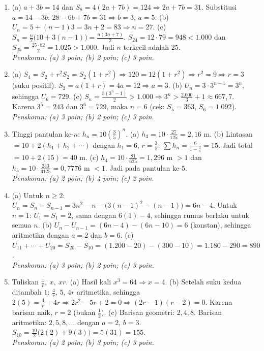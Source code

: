 \documentclass[a4paper,11pt]{article}
\newcommand{\dis}{\displaystyle}
\begin{document}
\small\begin{enumerate}[leftmargin=2em,itemsep=3pt,topsep=2pt]
\item[\textbf{1.}] (a) $a+3b=14$ dan $S_8=4(2a+7b)=124\Rightarrow2a+7b=31$. Substitusi $a=14-3b$: $28-6b+7b=31\Rightarrow b=3$, $a=5$. (b) $U_n=5+(n-1)3=3n+2=83\Rightarrow n=27$. (c) $S_n=\dis\frac n2\big(10+3(n-1)\big)=\dis\frac{n(3n+7)}{2}$. $S_{24}=12\cdot79=948<1.000$ dan $S_{25}=\dis\frac{25\cdot82}{2}=1.025>1.000$. Jadi $n$ terkecil adalah $25$. \\ \textit{Penskoran: (a) 3 poin; (b) 2 poin; (c) 3 poin.}
\item[\textbf{2.}] (a) $S_4=S_2+r^{2}S_2=S_2(1+r^{2})\Rightarrow120=12(1+r^{2})\Rightarrow r^{2}=9\Rightarrow r=3$ (suku positif). $S_2=a(1+r)=4a=12\Rightarrow a=3$. (b) $U_n=3\cdot3^{n-1}=3^{n}$, sehingga $U_6=729$. (c) $S_n=\dis\frac{3(3^{n}-1)}{2}>1.000\Rightarrow3^{n}>\dis\frac{2.000}{3}+1\approx667{,}7$. Karena $3^{5}=243$ dan $3^{6}=729$, maka $n=6$ (cek: $S_5=363$, $S_6=1.092$). \\ \textit{Penskoran: (a) 3 poin; (b) 2 poin; (c) 3 poin.}
\item[\textbf{3.}] Tinggi pantulan ke-$n$: $h_n=10\left(\dis\frac35\right)^{n}$. (a) $h_3=10\cdot\dis\frac{27}{125}=2{,}16$ m. (b) Lintasan $=10+2(h_1+h_2+\cdots)$ dengan $h_1=6$, $r=\dis\frac35$: $\sum h_n=\dis\frac{6}{1-\frac35}=15$. Jadi total $=10+2(15)=40$ m. (c) $h_4=10\cdot\dis\frac{81}{625}=1{,}296$ m $>1$ dan $h_5=10\cdot\dis\frac{243}{3125}=0{,}7776$ m $<1$. Jadi pada pantulan ke-$5$. \\ \textit{Penskoran: (a) 2 poin; (b) 4 poin; (c) 2 poin.}
\item[\textbf{4.}] (a) Untuk $n\ge2$: $U_n=S_n-S_{n-1}=3n^{2}-n-\big(3(n-1)^{2}-(n-1)\big)=6n-4$. Untuk $n=1$: $U_1=S_1=2$, sama dengan $6(1)-4$, sehingga rumus berlaku untuk semua $n$. (b) $U_n-U_{n-1}=(6n-4)-(6n-10)=6$ (konstan), sehingga aritmetika dengan $a=2$ dan $b=6$. (c) $U_{11}+\cdots+U_{20}=S_{20}-S_{10}=(1.200-20)-(300-10)=1.180-290=890$. \\ \textit{Penskoran: (a) 3 poin; (b) 2 poin; (c) 3 poin.}
\item[\textbf{5.}] Tuliskan $\dis\frac xr,\ x,\ xr$. (a) Hasil kali $x^{3}=64\Rightarrow x=4$. (b) Setelah suku kedua ditambah $1$: $\dis\frac4r,\,5,\,4r$ aritmetika, sehingga $2(5)=\dis\frac4r+4r\Rightarrow2r^{2}-5r+2=0\Rightarrow(2r-1)(r-2)=0$. Karena barisan naik, $r=2$ (bukan $\dis\frac12$). (c) Barisan geometri: $2,4,8$. Barisan aritmetika: $2,5,8,\ldots$ dengan $a=2$, $b=3$. $S_{10}=\dis\frac{10}{2}\big(2(2)+9(3)\big)=5(31)=155$. \\ \textit{Penskoran: (a) 2 poin; (b) 3 poin; (c) 3 poin.}
\end{enumerate}
\end{document}
